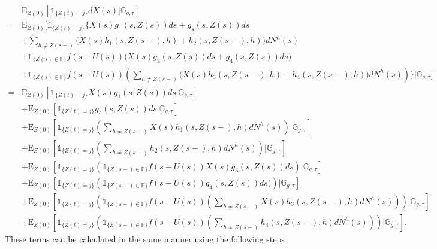 \documentclass[12pt]{article}
\newcommand{\E}{\text{E}}
\newcommand{\indic}[1]{\mathds{1}_{ \{ #1 \} }}
\begin{document}
\begin{align*}
& \E_{Z(0)} [  \indic{Z(t)=j} dX(s)|\mathbb{G}_{g,\tau}]
\\
=
&\E_{Z(0)} \Bigg[  \indic{Z(t)=j} \Bigg\lbrace
 X(s)g_1(s,Z(s)) ds + g_s(s,Z(s)) ds 
\\
& + \sum_{h \neq Z(s-)} \big( X(s) h_1(s,Z(s-),h)+h_2(s,Z(s-),h) \big) dN^h(s)
\\
&+ \indic{Z(s) \in \mathbb{F} } f(s-U(s))\big(  X(s) g_3(s,Z(s)) ds + g_4(s,Z(s)) ds \big)
\\
& +  \indic{Z(s) \in \mathbb{F} } f(s-U(s)) \left( \sum_{h \neq Z(s-)} \big( X(s) h_3(s,Z(s-),h)+h_4(s,Z(s-),h) \big) dN^h(s) \right) \Bigg\rbrace  \bigg| \mathbb{G}_{g,\tau} \Bigg] \\
= 
&\E_{Z(0)} [  \indic{Z(t)=j}   X(s)g_1(s,Z(s)) ds  | \mathbb{G}_{g,\tau}  ] \\
&+\E_{Z(0)} [  \indic{Z(t)=j}  g_s(s,Z(s)) ds  | \mathbb{G}_{g,\tau}  ] \\
&+\E_{Z(0)} [  \indic{Z(t)=j} \left( \sum_{h \neq Z(s-)}  X(s) h_1(s,Z(s-),h) dN^h(s) \right) | \mathbb{G}_{g,\tau}  ] \\
&+ \E_{Z(0)} [  \indic{Z(t)=j} \left( \sum_{h \neq Z(s-)} h_2(s,Z(s-),h)  dN^h(s) \right) | \mathbb{G}_{g,\tau}  ] \\
&+ \E_{Z(0)} [  \indic{Z(t)=j} \left(\indic{Z(s-) \in \mathbb{F} } f(s-U(s)) X(s) g_3(s,Z(s)) ds  \right) | \mathbb{G}_{g,\tau}  ] \\
&+ \E_{Z(0)} [  \indic{Z(t)=j} \left(\indic{Z(s-) \in \mathbb{F} } f(s-U(s)) g_4(s,Z(s)) ds \big) \right) | \mathbb{G}_{g,\tau}  ] \\
&+ \E_{Z(0)} [  \indic{Z(t)=j} \left(\indic{Z(s-) \in \mathbb{F} } f(s-U(s)) \left( \sum_{h \neq Z(s-)}  X(s) h_3(s,Z(s-),h) dN^h(s) \right) \right) | \mathbb{G}_{g,\tau}  ] \\
&+ \E_{Z(0)} [  \indic{Z(t)=j} \left(\indic{Z(s-) \in \mathbb{F} } f(s-U(s)) \left( \sum_{h \neq Z(s-)} h_4(s,Z(s-),h)  dN^h(s) \right) \right) | \mathbb{G}_{g,\tau}  ].
\end{align*}
These terms can be calculated in the same manner using the following steps
\end{document}
